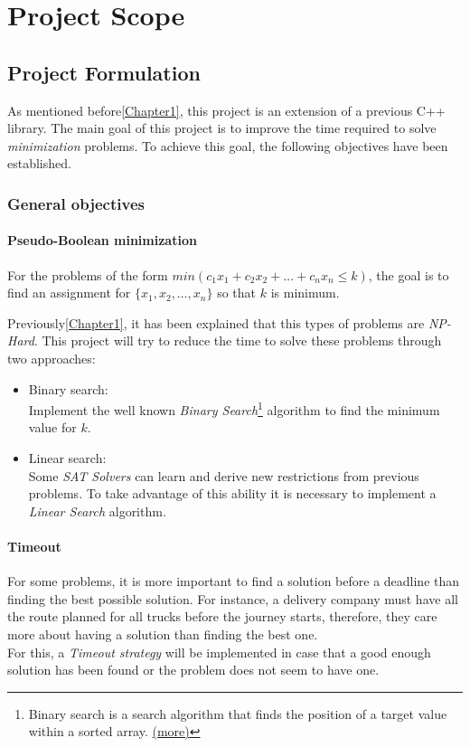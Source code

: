 \chapter{Project Scope}
\label{Chapter2}

\section{Project Formulation}

As mentioned before\ref{Chapter1}, this project is an extension of a previous C++ library. The main goal of this project is to improve the time required to solve \emph{minimization} problems. To achieve this goal, the following objectives have been established. 

\subsection{General objectives}

\subsubsection{Pseudo-Boolean minimization}
For the problems of the form $min(c_{1}x_{1}+c_{2}x_{2}+\ldots +c_{n}x_{n} \leq k)$, the goal is to find an assignment for $\{x_{1},x_{2},\ldots,x_{n}\}$ so that $k$ is minimum.

Previously\ref{Chapter1}, it has been explained that this types of problems are \emph{NP-Hard}. This project will try to reduce the time to solve these problems through two approaches:
\begin{itemize}
	\item Binary search:\\
	Implement the well known \emph{Binary Search}\footnote{Binary search is a search algorithm that finds the position of a target value within a sorted array. \href{https://en.wikipedia.org/wiki/Binary_search_algorithm}{(more)}} algorithm to find the minimum value for $k$.
	\item Linear search:\\
	Some \emph{SAT Solvers} can learn and derive new restrictions from previous problems. To take advantage of this ability it is necessary to implement a \emph{Linear Search} algorithm.
\end{itemize}

\subsubsection{Timeout}
For some problems, it is more important to find a solution before a deadline than finding the best possible solution. For instance, a delivery company must have all the route planned for all trucks before the journey starts, therefore, they care more about having a solution than finding the best one.\\
For this, a \emph{Timeout strategy} will be implemented in case that a good enough solution has been found or the problem does not seem to have one. 
